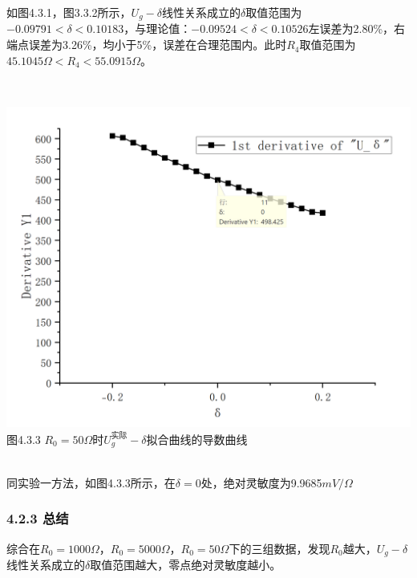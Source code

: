 \documentclass{ctexart}
\begin{document}
    如图4.3.1，图3.3.2所示，$U_g - \delta$线性关系成立的$\delta$取值范围为$-0.09791<\delta<0.10183$，与理论值：$-0.09524<\delta<0.10526$左误差为2.80\%，右端点误差为3.26\%，均小于5\%，误差在合理范围内。此时$R_4$取值范围为$45.1045\Omega<R_4<55.0915\Omega$。

    ~\\
    \begin{minipage}[c]{1\textwidth}
        \centering \includegraphics[scale=0.4]{3.1.3} \\\small{图4.3.3 $R_0=50\Omega$时$U_g^{\text{实际}} - \delta$拟合曲线的导数曲线}
    \end{minipage}
    ~\\

    同实验一方法，如图4.3.3所示，在$\delta=0$处，绝对灵敏度为9.9685$mV/\Omega$

    \subsubsection*{4.2.3 总结}
    综合在$R_0=1000\Omega$，$R_0=5000\Omega$，$R_0=50\Omega$下的三组数据，发现$R_0$越大，$U_g - \delta$线性关系成立的$\delta$取值范围越大，零点绝对灵敏度越小。
\end{document}
